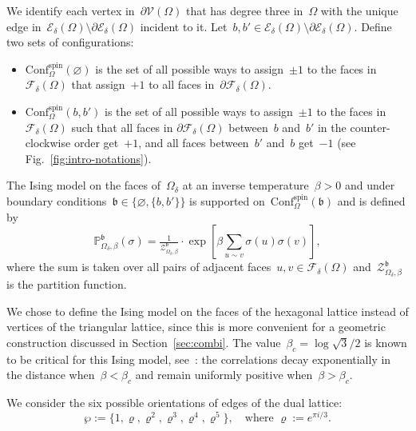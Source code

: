 \documentclass[reqno,11pt,a4paper]{amsart}
\theoremstyle{remark}
\newcommand{\calE}{\mathcal{E}}
\newcommand{\calV}{\mathcal{V}}
\newcommand{\bbP}{\mathbb{P}}
\newcommand{\Edges}{\mathcal{E}}
\newcommand{\Faces}{\mathcal{F}}
\renewcommand{\b}{\mathfrak{b}}
\newcommand{\conf}{\mathrm{Conf}}
\newcommand\ConfOs[1]{\conf^{\mathrm{spin}}_\Omega(#1)}
\def\cZ{\mathcal Z}
\begin{document}
We identify each vertex in~$\partial\calV(\Omega)$ that has degree three in~$\Omega$ with the unique edge in~$\Edges_\delta(\Omega)\setminus \partial\calE_\delta(\Omega)$ incident to it.
Let~$b,b'\in \Edges_\delta(\Omega)\setminus \partial\calE_\delta(\Omega)$.
Define two sets of configurations:
\begin{itemize}
	\item $\ConfOs{\varnothing}$ is the set of all possible ways to assign~$\pm 1$ to the faces in $\Faces_\delta(\Omega)$ that assign~$+1$ to all faces in~$\partial\Faces_\delta(\Omega)$.
	\item $\ConfOs{b,b'}$ is the set of all possible ways to assign~$\pm 1$ to the faces in $\Faces_\delta(\Omega)$ such that all faces in $\partial\Faces_\delta(\Omega)$ between~$b$ and~$b'$ in the counter-clockwise order get~$+1$, and all faces between~$b'$ and~$b$ get~$-1$ (see Fig.~\ref{fig:intro-notations}).
\end{itemize}

The Ising model on the faces of~$\Omega_\delta$ at an inverse temperature~$\beta>0$ and under boundary conditions~$\b\in \{\varnothing,\{b,b'\}\}$ is supported on~$\ConfOs{\b}$ and is defined by 
\begin{equation}
	\label{eq:def-ising-hex}
	\bbP_{\Omega_\delta,\beta}^{\b}(\sigma) = \tfrac{1}{\cZ_{\Omega_\delta,\beta}^{\b}}\cdot 
	\exp[\beta\sum_{u\sim v}{\sigma(u)\sigma(v)}],
\end{equation}
where the sum is taken over all pairs of adjacent faces~$u,v\in \Faces_\delta(\Omega)$ and~$\cZ_{\Omega_\delta,\beta}^{\b}$ is the partition function.

We chose to define the Ising model on the faces of the hexagonal lattice instead of vertices of the triangular lattice, since this is more convenient for a geometric construction discussed in Section~\ref{sec:combi}.
The value~$\beta_c=\log \sqrt{3}/2$ is known to be critical for this Ising model, see~\cite{Wan50,AizBarFer87}: the correlations decay exponentially in the distance when~$\beta < \beta_c$ and remain uniformly positive when~$\beta>\beta_c$. 

We consider the six possible orientations of edges of the dual lattice:
\[
	\wp:= \{1,\varrho,\varrho^2,\varrho^3,\varrho^4,\varrho^5\}, 
	\quad
	\text{where } \varrho:= e^{\pi i/3}.
\]
\end{document}
